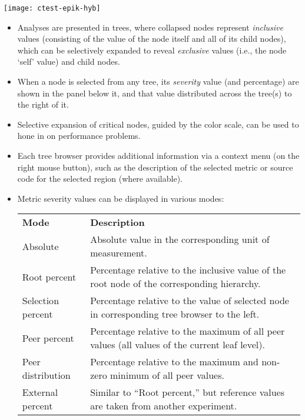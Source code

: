 \documentclass[a4paper]{article}
\begin{document}
\texttt{[image: ctest-epik-hyb]}

\vspace*{-2mm}
\begin{itemize}
  \item Analyses are presented in trees, where collapsed nodes represent
{\em inclusive\/} values (consisting of the value of the node itself and all of
its child nodes), which can be selectively expanded to reveal {\em exclusive\/}
values (i.e., the node `self' value) and child nodes.
  \item When a node is selected from any tree, 
        its {\em severity\/} value (and percentage) are shown in the panel below it,
        and that value distributed across the tree(s) to the right of it.

  \item Selective expansion of critical nodes, guided by the
color scale, can be used to hone in on performance problems.

  \item Each tree browser provides additional information via a context menu 
        (on the right mouse button), such as the description of the selected metric
        or source code for the selected region (where available).
  \item Metric severity values can be displayed in various modes: \\[1ex]
    \begin{tabularx}{\linewidth}{lX}
      \textbf{Mode} & \textbf{Description} \\

      Absolute &
        Absolute value in the corresponding unit of measurement. \\

      Root percent &
        Percentage relative to the inclusive value of the root node of the
        corresponding hierarchy. \\

      Selection percent &
        Percentage relative to the value of selected node in corresponding
        tree browser to the left. \\

      Peer percent &
        Percentage relative to the maximum of all peer values (all values of
        the current leaf level). \\

      Peer distribution &
        Percentage relative to the maximum and non-zero minimum of all peer
        values. \\

      External percent &
        Similar to ``Root percent,'' but reference values are taken from
        another experiment.
    \end{tabularx}
\end{itemize}
\end{document}
